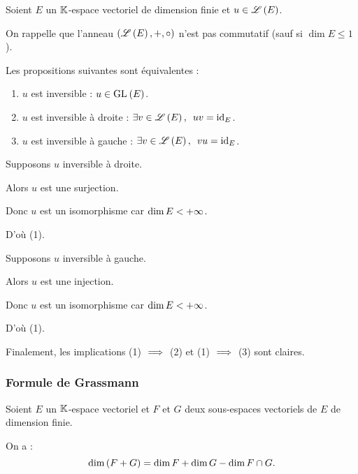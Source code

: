 \begin{cor}
Soient \(E\) un \(\mathbb{K}\)-espace vectoriel de dimension finie et \(u\in\mathscr{L}\left(E\right)\).

On rappelle que l'anneau \(\anneau{\Lendo{E}}[+][\rond]\) n'est pas commutatif (sauf si \(\dim E\leq1\)).

Les propositions suivantes sont équivalentes :

\begin{enumerate}
\item \(u\) est inversible : \(u\in\GL{}[E]\). \\

\item \(u\) est inversible à droite : \(\quantifs{\exists v\in\Lendo{E}}uv=\id{E}\). \\

\item \(u\) est inversible à gauche : \(\quantifs{\exists v\in\Lendo{E}}vu=\id{E}\).
\end{enumerate}
\end{cor}

\begin{dem}
Supposons \(u\) inversible à droite.

Alors \(u\) est une surjection.

Donc \(u\) est un isomorphisme car \(\dim E<+\infty\).

D'où (1).

Supposons \(u\) inversible à gauche.

Alors \(u\) est une injection.

Donc \(u\) est un isomorphisme car \(\dim E<+\infty\).

D'où (1).

Finalement, les implications (1) \(\implies\) (2) et (1) \(\implies\) (3) sont claires.
\end{dem}

\subsubsection{Formule de Grassmann}

\begin{prop}
Soient \(E\) un \(\mathbb{K}\)-espace vectoriel et \(F\) et \(G\) deux sous-espaces vectoriels de \(E\) de dimension finie.

On a : \[\dim\left(F+G\right)=\dim F+\dim G-\dim F\cap G.\]
\end{prop}

